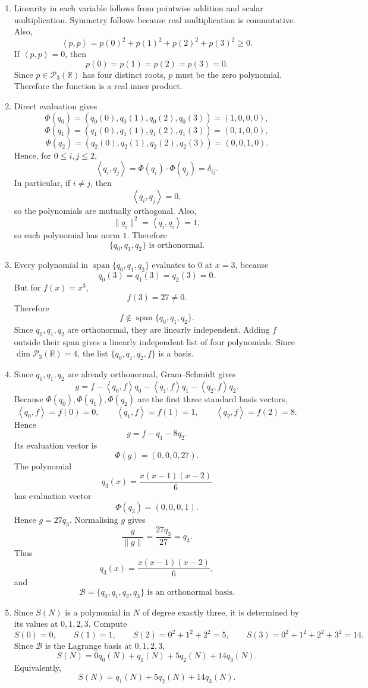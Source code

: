 \documentclass[12pt]{article}
\newcommand{\R}{\mathbb{R}}
\newcommand{\B}{\mathcal{B}}
\newcommand{\Ppoly}{\mathcal{P}}
\newcommand{\Span}{\operatorname{span}}
\newcommand{\ip}[2]{\left\langle #1,#2\right\rangle}
\begin{document}
\begin{enumerate}[label=(\alph*)]
  \item Linearity in each variable follows from pointwise addition and scalar multiplication. Symmetry follows because real multiplication is commutative. Also,
  \[
  \ip{p}{p}=p(0)^2+p(1)^2+p(2)^2+p(3)^2\ge0.
  \]
  If $\ip{p}{p}=0$, then
  \[
  p(0)=p(1)=p(2)=p(3)=0.
  \]
  Since $p\in\Ppoly_3(\R)$ has four distinct roots, $p$ must be the zero polynomial. Therefore the function is a real inner product.

\item Direct evaluation gives
\[
\Phi(q_0)=(q_0(0),q_0(1),q_0(2),q_0(3))=(1,0,0,0),
\]
\[
\Phi(q_1)=(q_1(0),q_1(1),q_1(2),q_1(3))=(0,1,0,0),
\]
\[
\Phi(q_2)=(q_2(0),q_2(1),q_2(2),q_2(3))=(0,0,1,0).
\]
Hence, for \(0\le i,j\le 2\),
\[
\ip{q_i}{q_j}
=
\Phi(q_i)\cdot \Phi(q_j)
=
\delta_{ij}.
\]
In particular, if \(i\ne j\), then
\[
\ip{q_i}{q_j}=0,
\]
so the polynomials are mutually orthogonal. Also,
\[
\|q_i\|^2=\ip{q_i}{q_i}=1,
\]
so each polynomial has norm \(1\). Therefore
\[
\boxed{\{q_0,q_1,q_2\}\text{ is orthonormal}.}
\]

  \item Every polynomial in $\Span\{q_0,q_1,q_2\}$ evaluates to $0$ at $x=3$, because
  \[
  q_0(3)=q_1(3)=q_2(3)=0.
  \]
  But for $f(x)=x^3$,
  \[
  f(3)=27\ne0.
  \]
  Therefore
  \[
  f\notin\Span\{q_0,q_1,q_2\}.
  \]
  Since $q_0,q_1,q_2$ are orthonormal, they are linearly independent. Adding $f$ outside their span gives a linearly independent list of four polynomials. Since $\dim\Ppoly_3(\R)=4$, the list $\{q_0,q_1,q_2,f\}$ is a basis.

  \item Since $q_0,q_1,q_2$ are already orthonormal, Gram--Schmidt gives
  \[
  g=f-\ip{q_0}{f}q_0-\ip{q_1}{f}q_1-\ip{q_2}{f}q_2.
  \]
  Because $\Phi(q_0),\Phi(q_1),\Phi(q_2)$ are the first three standard basis vectors,
  \[
  \ip{q_0}{f}=f(0)=0,
  \qquad
  \ip{q_1}{f}=f(1)=1,
  \qquad
  \ip{q_2}{f}=f(2)=8.
  \]
  Hence
  \[
  g=f-q_1-8q_2.
  \]
  Its evaluation vector is
  \[
  \Phi(g)=(0,0,0,27).
  \]
  The polynomial
  \[
  q_3(x)=\frac{x(x-1)(x-2)}6
  \]
  has evaluation vector
  \[
  \Phi(q_3)=(0,0,0,1).
  \]
  Hence $g=27q_3$. Normalising $g$ gives
  \[
  \frac{g}{\|g\|}=\frac{27q_3}{27}=q_3.
  \]
  Thus
  \[
  \boxed{q_3(x)=\frac{x(x-1)(x-2)}6,}
  \]
  and
  \[
  \boxed{\B=\{q_0,q_1,q_2,q_3\}\text{ is an orthonormal basis}.}
  \]

  \item Since $S(N)$ is a polynomial in $N$ of degree exactly three, it is determined by its values at $0,1,2,3$. Compute
  \[
  S(0)=0,
  \qquad
  S(1)=1,
  \qquad
  S(2)=0^2+1^2+2^2=5,
  \qquad
  S(3)=0^2+1^2+2^2+3^2=14.
  \]
  Since $\B$ is the Lagrange basis at $0,1,2,3$,
  \[
  \boxed{S(N)=0q_0(N)+q_1(N)+5q_2(N)+14q_3(N).}
  \]
  Equivalently,
  \[
  \boxed{S(N)=q_1(N)+5q_2(N)+14q_3(N).}
  \]
\end{enumerate}
\end{document}
